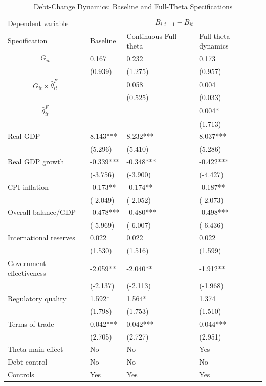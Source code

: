 \begin{table}[H]\centering
\begin{threeparttable}
\caption{Debt-Change Dynamics: Baseline and Full-Theta Specifications}
\label{tab:debt_change_combined_fulltheta}
\scriptsize
\begin{tabularx}{\textwidth}{lYYY}
\toprule
Dependent variable &  \\
\cmidrule(lr){2-4}
Specification & Baseline & Continuous Full-theta & Full-theta dynamics \\
\midrule
$$G_{it}$$ & 0.167 & 0.232 & 0.173 \\
 & (0.939) & (1.275) & (0.957) \\
$$G_{it}\times\widehat{\theta}^{F}_{it}$$ &  & 0.058 & 0.004 \\
 &  & (0.525) & (0.033) \\
$$\widehat{\theta}^{F}_{it}$$ &  &  & 0.004* \\
 &  &  & (1.713) \\
Real GDP & 8.143*** & 8.232*** & 8.037*** \\
 & (5.296) & (5.410) & (5.286) \\
Real GDP growth & -0.339*** & -0.348*** & -0.422*** \\
 & (-3.756) & (-3.900) & (-4.427) \\
CPI inflation & -0.173** & -0.174** & -0.187** \\
 & (-2.049) & (-2.052) & (-2.073) \\
Overall balance/GDP & -0.478*** & -0.480*** & -0.498*** \\
 & (-5.969) & (-6.007) & (-6.436) \\
International reserves & 0.022 & 0.022 & 0.022 \\
 & (1.530) & (1.516) & (1.599) \\
Government effectiveness & -2.059** & -2.040** & -1.912** \\
 & (-2.137) & (-2.113) & (-1.968) \\
Regulatory quality & 1.592* & 1.564* & 1.374 \\
 & (1.798) & (1.753) & (1.510) \\
Terms of trade & 0.042*** & 0.042*** & 0.044*** \\
 & (2.705) & (2.727) & (2.951) \\
\midrule
Theta main effect & No & No & Yes \\
Debt control & No & No & No \\
Controls & Yes & Yes & Yes \\

\end{tabularx}
\end{threeparttable}
\end{table}
